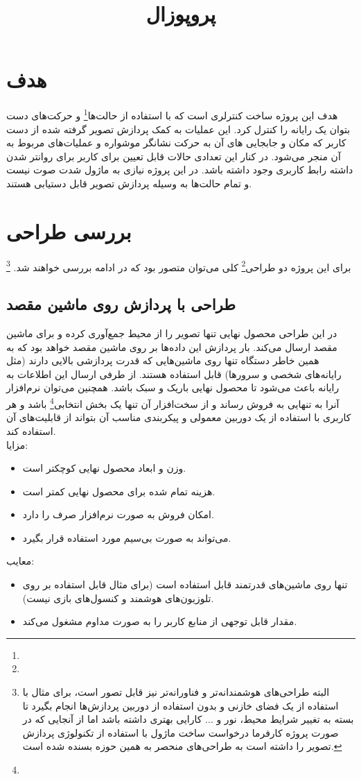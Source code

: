 \documentclass{article}
\title{پروپوزال}
\begin{document}
\heading
\header
\allowdisplaybreaks
\tableofcontents
\pagebreak

\section{هدف}
هدف این پروژه ساخت کنترلری است که با استفاده از حالت‌ها\footnote{} و حرکت‌های دست بتوان
یک رایانه‌ را کنترل کرد. این عملیات به کمک پردازش تصویر گرفته شده از دست کاربر که مکان و جابجایی های آن به حرکت نشانگر موشواره و عملیات‌های مربوط به آن منجر می‌شود. در کنار این تعدادی حالات قابل تعیین برای کاربر برای روانتر شدن داشته رابط کاربری وجود داشته باشد. در این پروژه نیازی به ماژول شدت صوت نیست و تمام حالت‌ها به وسیله پردازش تصویر قابل دستیابی هستند.

\section{بررسی طراحی}
برای این پروژه دو طراحی\footnote{} کلی می‌توان متصور بود که در ادامه بررسی خواهند شد. \footnote{البته‌ طراحی‌های هوشمندانه‌تر و فناورانه‌تر نیز قابل تصور است، برای مثال با استفاده از یک فضای خازنی و بدون استفاده از دوربین پردازش‌ها انجام بگیرد تا بسته به تغییر شرایط محیط، نور و ... کارایی بهتری داشته باشد اما از آنجایی که در صورت پروژه کارفرما درخواست ساخت ماژول با استفاده از تکنولوژی پردازش تصویر را داشته است به طراحی‌های منحصر به همین حوزه بسنده شده است.}

\subsection{طراحی با پردازش روی ماشین مقصد}
	در این طراحی محصول نهایی تنها تصویر را از محیط جمع‌آوری کرده و
	برای ماشین مقصد ارسال می‌کند. بار پردازش این داده‌ها بر روی ماشین مقصد خواهد بود که به همین خاطر دستگاه تنها روی ماشین‌هایی که قدرت  پردازشی بالایی دارند (مثل رایانه‌های شخصی و سرورها) قابل استفاده هستند. از طرفی ارسال این اطلاعات به رایانه باعث می‌شود تا محصول نهایی باریک و سبک باشد. همچنین می‌توان نرم‌افزار آنرا به تنهایی به فروش رساند و از سخت‌افزار آن تنها یک بخش انتخابی\footnote{} باشد و هر کاربری با استفاده از یک دوربین معمولی و پیکربندی
	مناسب آن بتواند از قابلیت‌های آن استفاده کند.
\\
	مزایا:
	\begin{itemize}
		\item وزن و ابعاد محصول نهایی کوچکتر است.
		\item هزینه تمام شده برای محصول نهایی کمتر است.
		\item امکان فروش به صورت نرم‌افزار صرف را دارد.
		\item می‌تواند به صورت بی‌سیم مورد استفاده قرار بگیرد.
	\end{itemize}
	معایب:
	\begin{itemize}
		\item تنها روی ماشین‌های قدرتمند قابل استفاده است (برای مثال قابل استفاده بر روی تلوزیون‌های هوشمند و کنسول‌های بازی نیست).
		\item مقدار قابل توجهی از منابع کاربر را به صورت مداوم مشغول می‌کند.
	\end{itemize}
	
\end{document}
